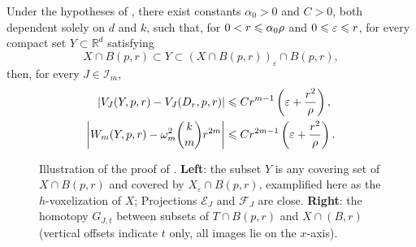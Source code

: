 \begin{theorem}
\label{thm:stabilite-projections}
Under the hypotheses of , there exist constants
$\alpha_0>0$ and $C>0$, both dependent solely on $d$ and $k$, such that, for
$0<r\leqslant \alpha_0\rho$ and $0\leqslant\varepsilon\leqslant r$, for every compact
set $Y\subset\mathbb R^d$ satisfying
\begin{equation}
\label{eq:encadrement-Y}
    X\cap B(p,r) \subset Y
    \subset (X\cap B(p,r))_\varepsilon\cap B(p,r),
\end{equation}
then, for every $J\in\mathcal I_m$,
\begin{align}
\label{eq:stabilite-VJ}
\left|V_J(Y,p,r)-V_J(D_r,p,r)\right|
&\leqslant C r^{m-1}\left(\varepsilon+\frac{r^2}{\rho}\right),\\
\label{eq:stabilite-W}
\left|W_m(Y,p,r)-\omega_m^2\binom{k}{m}r^{2m}\right|
&\leqslant C r^{2m-1}\left(\varepsilon+\frac{r^2}{\rho}\right).
\end{align}
\end{theorem}
\begin{figure}[t]
  
  \caption{\label{fig-proof-stability}Illustration of the proof of . \textbf{Left}: the subset $Y$ is any covering set of $X \cap B(p,r)$ and covered by $X_\varepsilon \cap B(p,r)$, examplified here as the $h$-voxelization of $X$; Projections $\mathcal{E}_J$ and $\mathcal{F}_J$ are close. \textbf{Right}: the homotopy $G_{J,t}$ between subsets of $T \cap B(p,r)$ and $X \cap(B,r)$ (vertical offsets indicate $t$ only, all images lie on the $x$-axis).  }
\end{figure}
